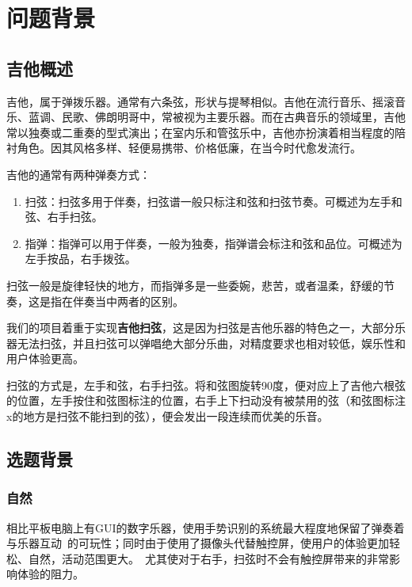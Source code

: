 \chapter{问题背景}

    \section{吉他概述}
    吉他，属于弹拨乐器。通常有六条弦，形状与提琴相似。吉他在流行音乐、摇滚音乐、蓝调、民歌、佛朗明哥中，常被视为主要乐器。而在古典音乐的领域里，吉他常以独奏或二重奏的型式演出；在室内乐和管弦乐中，吉他亦扮演着相当程度的陪衬角色。因其风格多样、轻便易携带、价格低廉，在当今时代愈发流行。


    吉他的通常有两种弹奏方式：

    \begin{enumerate}
        \item{扫弦}：扫弦多用于伴奏，扫弦谱一般只标注和弦和扫弦节奏。可概述为左手和弦、右手扫弦。
        \item{指弹}：指弹可以用于伴奏，一般为独奏，指弹谱会标注和弦和品位。可概述为左手按品，右手拨弦。
    \end{enumerate}


    扫弦一般是旋律轻快的地方，而指弹多是一些委婉，悲苦，或者温柔，舒缓的节奏，这是指在伴奏当中两者的区别。

    我们的项目着重于实现\textbf{吉他扫弦}，这是因为扫弦是吉他乐器的特色之一，大部分乐器无法扫弦，并且扫弦可以弹唱绝大部分乐曲，对精度要求也相对较低，娱乐性和用户体验更高。

    扫弦的方式是，左手和弦，右手扫弦。将和弦图旋转90度，便对应上了吉他六根弦的位置，左手按住和弦图标注的位置，右手上下扫动没有被禁用的弦（和弦图标注x的地方是扫弦不能扫到的弦），便会发出一段连续而优美的乐音。


    \section{选题背景}

        \subsection{自然}
        相比平板电脑上有GUI的数字乐器，使用手势识别的系统最大程度地保留了弹奏着与乐器互动\
        的可玩性；同时由于使用了摄像头代替触控屏，使用户的体验更加轻松、自然，活动范围更大。\
        尤其使对于右手，扫弦时不会有触控屏带来的非常影响体验的阻力。

